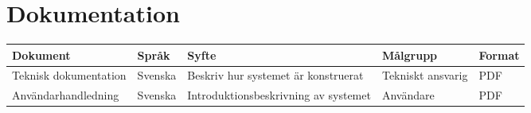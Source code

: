 \section{Dokumentation}

\begin{center}
	\begin{table}[h]
		\begin{tabularx}{\textwidth}{| l | l | X | l | l |}
			\hline
			\textbf{Dokument} & \textbf{Språk} & \textbf{Syfte} & \textbf{Målgrupp} & \textbf{Format} \\
			\hline
			Teknisk dokumentation & Svenska & Beskriv hur systemet är konstruerat & Tekniskt ansvarig & PDF \\
			\hline
			Användarhandledning & Svenska & Introduktionsbeskrivning av systemet & Användare & PDF \\
			\hline
		\end{tabularx}
	\end{table}
\end{center}

\begin{LIPSkravlista}
\end{LIPSkravlista}